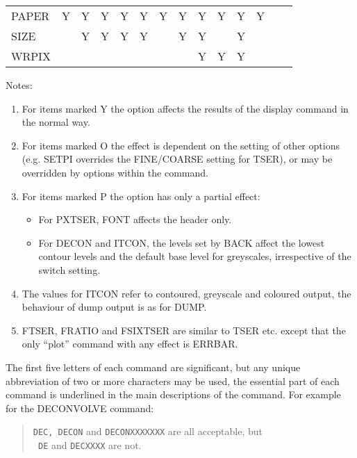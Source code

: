 \begin{table}
{\begin{center}
\begin{tabular}{|l|*{7}{c}|*{4}{c}|*{2}{c}|}
PAPER & Y & Y & Y & Y & Y & Y & Y & Y & Y & Y & Y & & \\
SIZE & & Y & Y & Y & Y & & Y & Y & & Y & & & \\
WRPIX & & & & & & & & Y & Y & Y & & & \\
\hline
\end{tabular}
\end{center}
Notes:
\begin{enumerate}
\item For items marked Y the option affects the results of the display command
in the normal way.
\item For items marked O the effect is dependent on the setting of other
options (e.g. SETPI overrides the FINE/COARSE setting for TSER), or may
be overridden by options within the command.
\item For items marked P the option has only a partial effect:
\begin{itemize}
\item For PXTSER, FONT affects the header only.
\item For DECON and ITCON, the levels set by BACK affect the lowest contour
levels and the default base level for greyscales, irrespective of the
switch setting.
\end{itemize}
\item The values for ITCON refer to contoured, greyscale and coloured output,
the behaviour of dump output is as for DUMP.
\item FTSER, FRATIO and FSIXTSER are similar to TSER etc. except that the only
``plot'' command with any effect is ERRBAR.
\end{enumerate}}
\end{table}

The first five letters of each command are significant, but any unique
abbreviation of two or more characters may be used, the essential part
of each command is underlined in the main descriptions of the command.
For example for the DECONVOLVE command:
\begin{quote}
{\tt DEC, DECON} and {\tt DECONXXXXXXX} are all acceptable, but\\ {\tt
DE} and {\tt DECXXXX} are not.
\end{quote}

